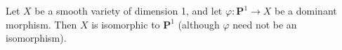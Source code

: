 Let $X$ be a smooth variety of dimension 1, and let $\varphi: \mathbf{P}^1 \rightarrow X$ be a dominant morphism. Then $X$ is isomorphic to $\mathbf{P}^1$ (although $\varphi$ need not be an isomorphism).

